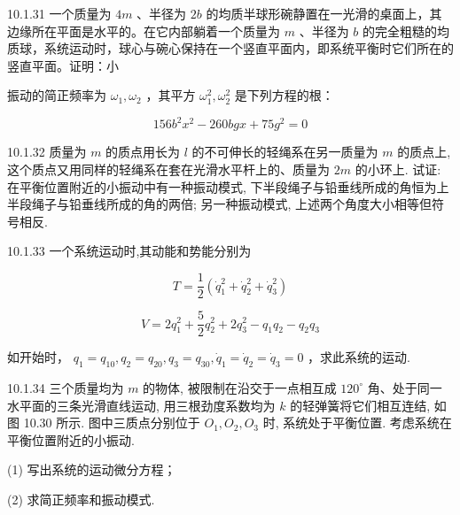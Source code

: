 \begin{problem}{10.1.31}
一个质量为 $4m$ 、半径为 $2b$ 的均质半球形碗静置在一光滑的桌面上，其边缘所在平面是水平的。在它内部躺着一个质量为 $m$ 、半径为 $b$ 的完全粗糙的均质球，系统运动时，球心与碗心保持在一个竖直平面内，即系统平衡时它们所在的竖直平面。证明：小

振动的简正频率为 $\omega_{1},\omega_{2}$ ，其平方 $\omega_1^2,\omega_2^2$ 是下列方程的根：

\[
1 5 6 b ^ {2} x ^ {2} - 2 6 0 b g x + 7 5 g ^ {2} = 0
\]
\end{problem}
\clearpage


\begin{problem}{10.1.32}
质量为 $m$ 的质点用长为 $l$ 的不可伸长的轻绳系在另一质量为 $m$ 的质点上, 这个质点又用同样的轻绳系在套在光滑水平杆上的、质量为 $2m$ 的小环上. 试证: 在平衡位置附近的小振动中有一种振动模式, 下半段绳子与铅垂线所成的角恒为上半段绳子与铅垂线所成的角的两倍; 另一种振动模式, 上述两个角度大小相等但符号相反.
\begin{center}

\end{center}
\end{problem}
\clearpage


\begin{problem}{10.1.33}
一个系统运动时,其动能和势能分别为

\[
T = \frac {1}{2} (\dot {q} _ {1} ^ {2} + \dot {q} _ {2} ^ {2} + \dot {q} _ {3} ^ {2})
\]

\[
V = 2 q _ {1} ^ {2} + \frac {5}{2} q _ {2} ^ {2} + 2 q _ {3} ^ {2} - q _ {1} q _ {2} - q _ {2} q _ {3}
\]

如开始时， $q_{1} = q_{10}, q_{2} = q_{20}, q_{3} = q_{30}, \dot{q}_{1} = \dot{q}_{2} = \dot{q}_{3} = 0$ ，求此系统的运动.
\end{problem}
\clearpage


\begin{problem}{10.1.34}
三个质量均为 $m$ 的物体, 被限制在沿交于一点相互成 $120^{\circ}$ 角、处于同一水平面的三条光滑直线运动, 用三根劲度系数均为 $k$ 的轻弹簧将它们相互连结, 如图 10.30 所示. 图中三质点分别位于 $O_{1}, O_{2}, O_{3}$ 时, 系统处于平衡位置. 考虑系统在平衡位置附近的小振动.

(1) 写出系统的运动微分方程；

(2) 求简正频率和振动模式.
\begin{center}

\end{center}
\end{problem}
\clearpage


